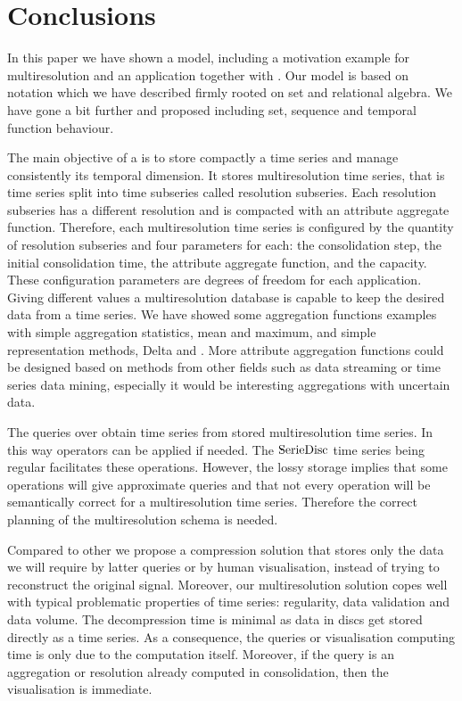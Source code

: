 





\section{Conclusions}
\label{sec:concl-future-work}


In this paper we have shown a  model, including a
motivation example for multiresolution and an application together
with . Our  model is based on 
notation which we have described firmly rooted on set and relational
algebra. We have gone a bit further and proposed  including
set, sequence and temporal function behaviour.



The main objective of a  is to store compactly a time
series and manage consistently its temporal dimension.  It stores
multiresolution time series, that is time series split into time
subseries called resolution subseries.  Each resolution subseries has
a different resolution and is compacted with an attribute aggregate
function. Therefore, each multiresolution time series is configured by
the quantity of resolution subseries and four parameters for each: the
consolidation step, the initial consolidation time, the attribute
aggregate function, and the capacity.  These configuration parameters
are degrees of freedom for each application. Giving different values a
multiresolution database is capable to keep the desired data
from a time series. %
We have showed some aggregation functions examples with simple
aggregation statistics, mean and maximum, and simple representation
methods, Delta and \zohe{}. More attribute aggregation functions could
be designed based on methods from other fields such as data streaming
or time series data mining, especially it would be interesting aggregations with uncertain data.


The queries over  obtain time series from stored
multiresolution time series. In this way  operators can be
applied if needed. The $\operatorname{SerieDisc}$ time series being regular
facilitates these operations. However, the lossy storage implies that
some operations will give approximate queries and that not every
 operation will be semantically correct for a
multiresolution time series. Therefore the correct planning of the
multiresolution schema is needed.


Compared to other  we propose a compression solution that
stores only the data we will require by latter queries or by
human visualisation, instead of trying to reconstruct the original
signal.  Moreover, our multiresolution solution copes well with
typical problematic properties of time series: regularity, data
validation and data volume.  The decompression time is minimal as data
in discs get stored directly as a time series. As a consequence, the
queries or visualisation computing time is only due to the computation
itself. Moreover, if the query is an aggregation or resolution already
computed in  consolidation, then the visualisation is
immediate.


